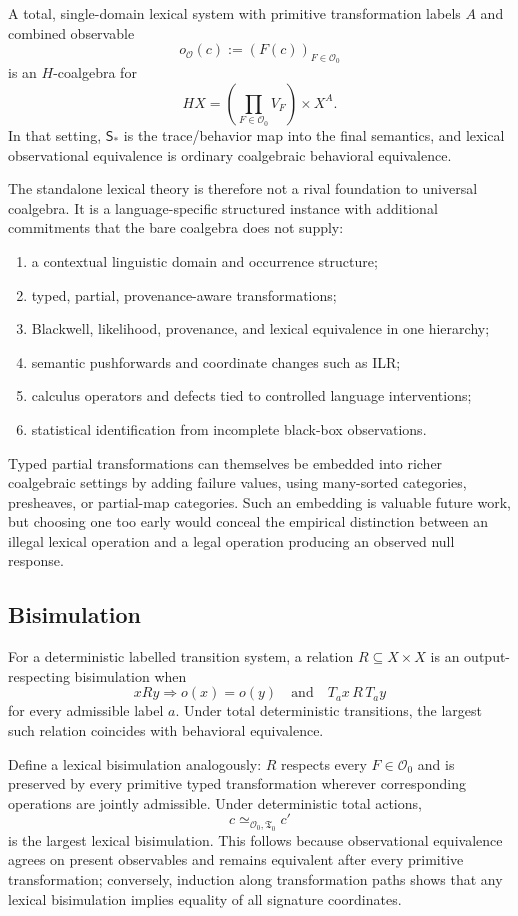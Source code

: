 \documentclass[11pt]{article}
\newcommand{\Trans}{\mathfrak T}
\begin{document}
{A total, single-domain lexical system with primitive transformation labels $A$ and combined observable
\[
 o_{\mathcal O}(c):=(F(c))_{F\in\mathcal O_0}
\]
is an $H$-coalgebra for
\[
 H X=\left(\prod_{F\in\mathcal O_0}V_F\right)\times X^A.
\]
In that setting, $\mathsf S_*$ is the trace/behavior map into the final semantics, and lexical observational equivalence is ordinary coalgebraic behavioral equivalence.

The standalone lexical theory is therefore not a rival foundation to universal coalgebra. It is a language-specific structured instance with additional commitments that the bare coalgebra does not supply:
\begin{enumerate}
\item a contextual linguistic domain and occurrence structure;
\item typed, partial, provenance-aware transformations;
\item Blackwell, likelihood, provenance, and lexical equivalence in one hierarchy;
\item semantic pushforwards and coordinate changes such as ILR;
\item calculus operators and defects tied to controlled language interventions;
\item statistical identification from incomplete black-box observations.
\end{enumerate}

Typed partial transformations can themselves be embedded into richer coalgebraic settings by adding failure values, using many-sorted categories, presheaves, or partial-map categories. Such an embedding is valuable future work, but choosing one too early would conceal the empirical distinction between an illegal lexical operation and a legal operation producing an observed null response.

\subsection{Bisimulation}

For a deterministic labelled transition system, a relation $R\subseteq X\times X$ is an output-respecting bisimulation when
\[
 xRy\Longrightarrow o(x)=o(y)
 \quad\text{and}\quad
 T_a x\,R\,T_a y
\]
for every admissible label $a$. Under total deterministic transitions, the largest such relation coincides with behavioral equivalence.

Define a lexical bisimulation analogously: $R$ respects every $F\in\mathcal O_0$ and is preserved by every primitive typed transformation wherever corresponding operations are jointly admissible. Under deterministic total actions,
\[
 c\simeq_{\mathcal O_0,\Trans_0}c'
\]
is the largest lexical bisimulation. This follows because observational equivalence agrees on present observables and remains equivalent after every primitive transformation; conversely, induction along transformation paths shows that any lexical bisimulation implies equality of all signature coordinates.

}
\end{document}
